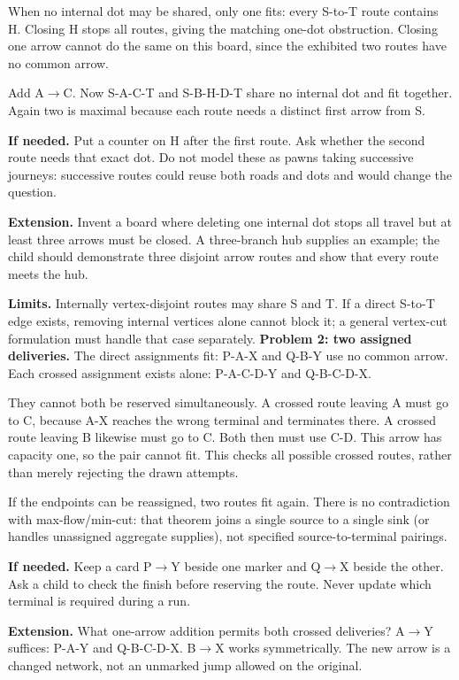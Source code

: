 \documentclass[11pt]{article}
\begin{document}
When no internal dot may be shared, only one fits: every S-to-T route contains H. Closing H stops all routes, giving the matching one-dot obstruction. Closing one arrow cannot do the same on this board, since the exhibited two routes have no common arrow.

Add A\(\to\)C. Now S-A-C-T and S-B-H-D-T share no internal dot and fit together. Again two is maximal because each route needs a distinct first arrow from S.

\textbf{If needed.} Put a counter on H after the first route. Ask whether the second route needs that exact dot. Do not model these as pawns taking successive journeys: successive routes could reuse both roads and dots and would change the question.

\textbf{Extension.} Invent a board where deleting one internal dot stops all travel but at least three arrows must be closed. A three-branch hub supplies an example; the child should demonstrate three disjoint arrow routes and show that every route meets the hub.

\textbf{Limits.} Internally vertex-disjoint routes may share S and T. If a direct S-to-T edge exists, removing internal vertices alone cannot block it; a general vertex-cut formulation must handle that case separately.
\newpage
\textbf{Problem 2: two assigned deliveries.} The direct assignments fit: P-A-X and Q-B-Y use no common arrow. Each crossed assignment exists alone: P-A-C-D-Y and Q-B-C-D-X.

They cannot both be reserved simultaneously. A crossed route leaving A must go to C, because A-X reaches the wrong terminal and terminates there. A crossed route leaving B likewise must go to C. Both then must use C-D. This arrow has capacity one, so the pair cannot fit. This checks all possible crossed routes, rather than merely rejecting the drawn attempts.

If the endpoints can be reassigned, two routes fit again. There is no contradiction with max-flow/min-cut: that theorem joins a single source to a single sink (or handles unassigned aggregate supplies), not specified source-to-terminal pairings.

\textbf{If needed.} Keep a card P\(\to\)Y beside one marker and Q\(\to\)X beside the other. Ask a child to check the finish before reserving the route. Never update which terminal is required during a run.

\textbf{Extension.} What one-arrow addition permits both crossed deliveries? A\(\to\)Y suffices: P-A-Y and Q-B-C-D-X. B\(\to\)X works symmetrically. The new arrow is a changed network, not an unmarked jump allowed on the original.
\end{document}
